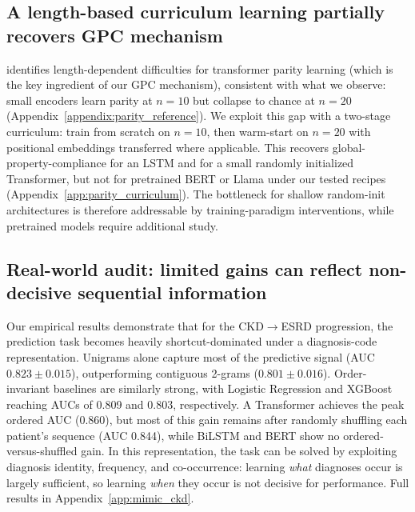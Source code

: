 \documentclass{article}
\theoremstyle{plain}
\theoremstyle{definition}
\theoremstyle{remark}
\begin{document}
\subsection{A length-based curriculum learning partially recovers GPC mechanism}
\label{sec:curriculum}
\citet{hahn-2020-theoretical} identifies length-dependent difficulties for transformer parity learning (which is the key ingredient of our GPC mechanism), consistent with what we observe: small encoders learn parity at $n=10$ but collapse to chance at $n=20$ (Appendix~\ref{appendix:parity_reference}). We exploit this gap with a two-stage curriculum: train from scratch on $n=10$, then warm-start on $n=20$ with positional embeddings transferred where applicable. This recovers global-property-compliance for an LSTM and for a small randomly initialized Transformer, but not for pretrained BERT or Llama under our tested recipes (Appendix~\ref{app:parity_curriculum}). The bottleneck for shallow random-init architectures is therefore addressable by training-paradigm interventions, while pretrained models require additional study.

\subsection{Real-world audit: limited gains can reflect non-decisive sequential information}
\label{sec:mimic_ckd_results}
Our empirical results demonstrate that for the CKD$\to$ESRD progression, the prediction task becomes heavily shortcut-dominated under a diagnosis-code representation. Unigrams alone capture most of the predictive signal (AUC $0.823 \pm 0.015$), outperforming contiguous 2-grams ($0.801 \pm 0.016$). Order-invariant baselines are similarly strong, with Logistic Regression and XGBoost reaching AUCs of 0.809 and 0.803, respectively. A Transformer achieves the peak ordered AUC (0.860), but most of this gain remains after randomly shuffling each patient's sequence (AUC 0.844), while BiLSTM and BERT show no ordered-versus-shuffled gain. In this representation, the task can be solved by exploiting diagnosis identity, frequency, and co-occurrence: learning \emph{what} diagnoses occur is largely sufficient, so learning \emph{when} they occur is not decisive for performance. Full results in Appendix~\ref{app:mimic_ckd}.

\end{document}
